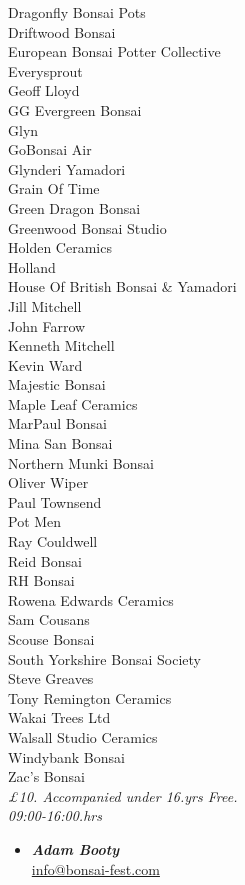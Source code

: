 \begin{itemize}
    Dragonfly Bonsai Pots \\
    Driftwood Bonsai \\
    European Bonsai Potter Collective \\
    Everysprout \\
    Geoff Lloyd \\
    GG Evergreen Bonsai \\
    Glyn \\
    GoBonsai Air \\
    Glynderi Yamadori \\
    Grain Of Time \\
    Green Dragon Bonsai \\
    Greenwood Bonsai Studio \\
    Holden Ceramics \\
    Holland \\
    House Of British Bonsai \& Yamadori \\
    Jill Mitchell \\
    John Farrow \\
    Kenneth Mitchell \\
    Kevin Ward \\
    Majestic Bonsai \\
    Maple Leaf Ceramics \\
    MarPaul Bonsai \\
    Mina San Bonsai \\
    Northern Munki Bonsai \\
    Oliver Wiper \\
    Paul Townsend \\
    Pot Men \\
    Ray Couldwell \\
    Reid Bonsai \\
    RH Bonsai \\
    Rowena Edwards Ceramics \\
    Sam Cousans \\
    Scouse Bonsai \\
    South Yorkshire Bonsai Society \\
    Steve Greaves \\
    Tony Remington Ceramics \\
    Wakai Trees Ltd \\
    Walsall Studio Ceramics \\
    Windybank Bonsai \\
    Zac's Bonsai
    \\
    \emph{£10. Accompanied under 16.yrs Free.} \\
    \emph{09:00-16:00.hrs}
    \begin{itemize}
        \item \textbf{\emph{Adam Booty}} \\
        \href{mailto:info@bonsai-fest.com}{info@bonsai-fest.com} 
    \end{itemize}


\end{itemize}
